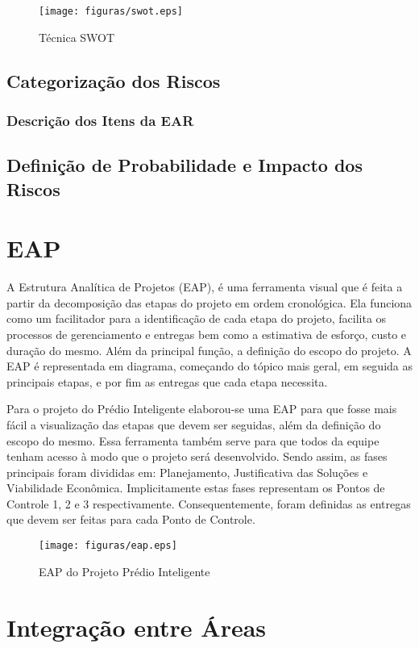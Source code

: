 \begin{figure}[!h]
 \centering
 \texttt{[image: figuras/swot.eps]}
 \caption{Técnica SWOT}
\end{figure}

\section{Categorização dos Riscos}
\subsection{Descrição dos Itens da EAR}
\section{Definição de Probabilidade e Impacto dos Riscos}



\chapter{EAP}
A Estrutura Analítica de Projetos (EAP), é uma ferramenta visual que é feita a partir da decomposição das etapas do projeto em ordem cronológica. Ela funciona como um facilitador para a identificação de cada etapa do projeto, facilita os processos de gerenciamento e entregas bem como a estimativa de esforço, custo e duração do mesmo. Além da principal função, a definição do escopo do projeto. A EAP é representada em diagrama, começando do tópico mais geral, em seguida as principais etapas, e por fim as entregas que cada etapa necessita.

Para o projeto do Prédio Inteligente elaborou-se uma EAP para que fosse mais fácil a visualização das etapas que devem ser seguidas, além da definição do escopo do mesmo. Essa ferramenta também serve para que todos da equipe tenham acesso à modo que o projeto será desenvolvido. Sendo assim, as fases principais foram divididas em: Planejamento, Justificativa das Soluções e Viabilidade Econômica. Implicitamente estas fases representam os Pontos de Controle 1, 2 e 3 respectivamente. Consequentemente, foram definidas as entregas que devem ser feitas para cada Ponto de Controle.
 \begin{figure}[!h]
 	\centering
 	\texttt{[image: figuras/eap.eps]}
 	\caption{EAP do Projeto Prédio Inteligente}
 	\label{fig01}
 \end{figure}

\chapter{Integração entre Áreas}
